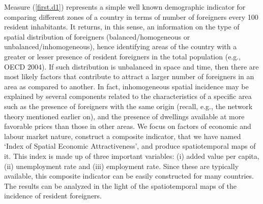 \documentclass[10pt] {article}
\theoremstyle{definition}
\theoremstyle{plain}
\begin{document}
Measure (\ref{first.d1}) represents a simple well known demographic indicator for comparing different zones of a country in terms of number of foreigners every 100 resident inhabitants. It returns, in this sense, an information on the type of spatial distribution of foreigners (balanced/homogeneous or unbalanced/inhomogeneous), hence identifying areas of the country with a greater or lesser presence of resident foreigners in the total population (e.g., OECD 2004). If such distribution is unbalanced in space and time, then there are most likely factors that contribute to attract a larger number of foreigners in an area as compared to another. In fact, inhomogeneous spatial incidence may be explained by several components related to the characteristics of a specific area such as the presence of foreigners with the same origin (recall, e.g., the network theory mentioned earlier on), and the presence of dwellings available at more favorable prices than those in other areas. We focus on factors of economic and labour market nature, construct a composite indicator, that we have named `Index of Spatial Economic Attractiveness', and produce spatiotemporal maps of it. This index is made up of three important variables: (i) added value per capita, (ii) unemployment rate and (iii) employment rate. Since these are typically available, this composite indicator can be easily constructed for many countries. The results can be analyzed in the light of the spatiotemporal maps of the incidence of resident foreigners.
\end{document}
